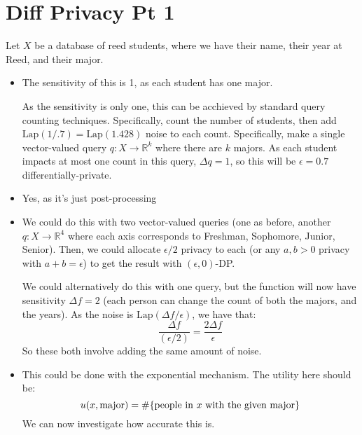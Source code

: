 \documentclass{article}
\theoremstyle{definition}
\begin{document}
\section{Diff Privacy Pt 1}
Let $X$ be a database of reed students, where we have their name, their year at Reed, and their major.
\begin{itemize}
\item The sensitivity of this is 1, as each student has one major.

As the sensitivity is only one, this can be acchieved by standard query counting techniques.
Specifically, count the number of students, then add $\text{Lap}(1/.7) = \text{Lap}(1.428)$ noise to each count.
Specifically, make a single vector-valued query $q:X\to\mathbb{R}^k$ where there are $k$ majors.
As each student impacts at most one count in this query, $\Delta q = 1$, so this will be $\epsilon = 0.7$ differentially-private.
\item Yes, as it's just post-processing
\item We could do this with two vector-valued queries (one as before, another $q:X\to \mathbb{R}^4$ where each axis corresponds to Freshman, Sophomore, Junior, Senior).
Then, we could allocate $\epsilon/2$ privacy to each (or any $a,b> 0$ privacy with $a+b = \epsilon$) to get the result with $(\epsilon,0)$-DP.

We could alternatively do this with one query, but the function will now have sensitivity $\Delta f = 2$ (each person can change the count of both the majors, and the years).
As the noise is $\text{Lap}(\Delta f/\epsilon)$, we have that:
\begin{equation}
\frac{\Delta f}{(\epsilon/2)} = \frac{2\Delta f}{\epsilon}
\end{equation}
So these both involve adding the same amount of noise.

\item This could be done with the exponential mechanism. The utility here should be:
\begin{equation}
u(x,\text{major}) = \#\Bqty{\text{people in }x\text{ with the given major}}
\end{equation}
We can now investigate how accurate this is.


\end{itemize}
\end{document}
